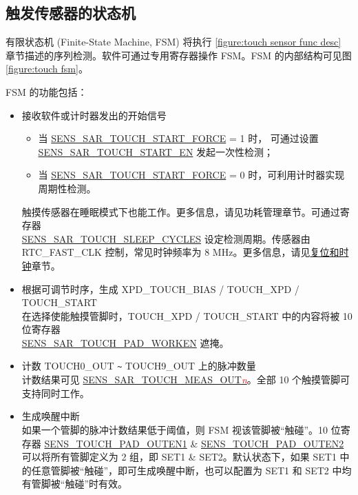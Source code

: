 \documentclass[main\_\_CN.tex]{subfiles}
\begin{document}
\subsection{触发传感器的状态机}

有限状态机 (Finite-State Machine, FSM) 将执行 \ref{figure:touch sensor func desc} 章节描述的序列检测。软件可通过专用寄存器操作 FSM。FSM 的内部结构可见图 \ref{figure:touch fsm}。

FSM 的功能包括：
\begin{itemize}
    \item 接收软件或计时器发出的开始信号
    \begin{itemize}
        \item 当 \hyperref[regdesc:SENSSARTOUCHCTRL2REG]{SENS\_SAR\_TOUCH\_START\_FORCE} = 1 时， 可通过设置 \hyperref[regdesc:SENSSARTOUCHCTRL2REG]{SENS\_SAR\_TOUCH\_START\_EN} 发起一次性检测；
        \item 当 \hyperref[regdesc:SENSSARTOUCHCTRL2REG]{SENS\_SAR\_TOUCH\_START\_FORCE} = 0 时，可利用计时器实现周期性检测。
    \end{itemize}
    触摸传感器在睡眠模式下也能工作。更多信息，请见功耗管理章节。可通过寄存器\\ \hyperref[regdesc:SENSSARTOUCHCTRL2REG]{SENS\_SAR\_TOUCH\_SLEEP\_CYCLES} 设定检测周期。传感器由 RTC\_FAST\_CLK 控制，常见时钟频率为 8 MHz。更多信息，请见\hyperref[mod:resclk]{复位和时钟}章节。
    \item 根据可调节时序，生成 XPD\_TOUCH\_BIAS / TOUCH\_XPD / TOUCH\_START\\
    在选择使能触摸管脚时，TOUCH\_XPD / TOUCH\_START 中的内容将被 10 位寄存器\\ \hyperref[regdesc:SENSSARTOUCHENABLEREG]{SENS\_SAR\_TOUCH\_PAD\_WORKEN} 遮掩。
    \item 计数 TOUCH0\_OUT \verb+~+ TOUCH9\_OUT 上的脉冲数量\\
    计数结果可见 \hyperref[regdesc:SENSSARTOUCHOUT1REG]{SENS\_SAR\_TOUCH\_MEAS\_OUT\textcolor{red}{\it{n}}}。全部 10 个触摸管脚可支持同时工作。
    \item 生成唤醒中断\\
    如果一个管脚的脉冲计数结果低于阈值，则 FSM 视该管脚被“触碰”。10 位寄存器 \hyperref[regdesc:SENSSARTOUCHENABLEREG]{SENS\_TOUCH\_PAD\_OUTEN1} \& \hyperref[regdesc:SENSSARTOUCHENABLEREG]{SENS\_TOUCH\_PAD\_OUTEN2} 可以将所有管脚定义为 2 组，即 SET1 \& SET2。默认状态下，如果 SET1 中的任意管脚被“触碰”，即可生成唤醒中断，也可以配置为 SET1 和 SET2 中均有管脚被“触碰”时有效。
\end{itemize}
\end{document}
